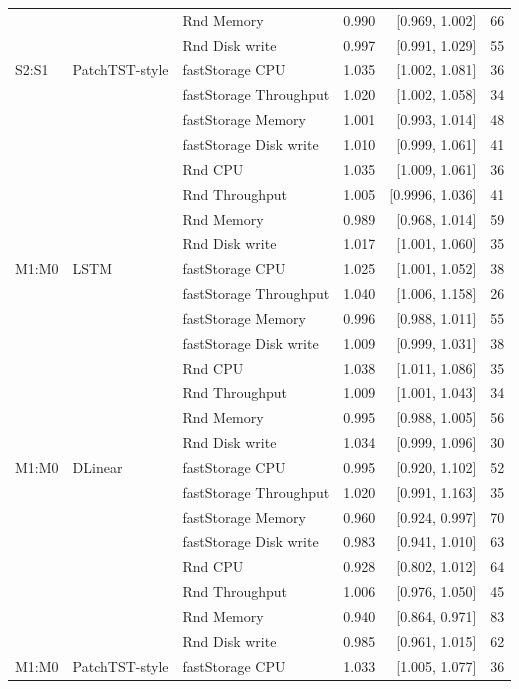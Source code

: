 \documentclass[a4paper,11pt]{article}
\begin{document}
\begin{longtable}{@{}lllrrr@{}}
 &  & Rnd Memory & 0.990 & [0.969, 1.002] & 66 \\
 &  & Rnd Disk write & 0.997 & [0.991, 1.029] & 55 \\
\addlinespace
S2:S1 & PatchTST-style & fastStorage CPU & 1.035 & [1.002, 1.081] & 36 \\
 &  & fastStorage Throughput & 1.020 & [1.002, 1.058] & 34 \\
 &  & fastStorage Memory & 1.001 & [0.993, 1.014] & 48 \\
 &  & fastStorage Disk write & 1.010 & [0.999, 1.061] & 41 \\
 &  & Rnd CPU & 1.035 & [1.009, 1.061] & 36 \\
 &  & Rnd Throughput & 1.005 & [0.9996, 1.036] & 41 \\
 &  & Rnd Memory & 0.989 & [0.968, 1.014] & 59 \\
 &  & Rnd Disk write & 1.017 & [1.001, 1.060] & 35 \\
\addlinespace
M1:M0 & LSTM & fastStorage CPU & 1.025 & [1.001, 1.052] & 38 \\
 &  & fastStorage Throughput & 1.040 & [1.006, 1.158] & 26 \\
 &  & fastStorage Memory & 0.996 & [0.988, 1.011] & 55 \\
 &  & fastStorage Disk write & 1.009 & [0.999, 1.031] & 38 \\
 &  & Rnd CPU & 1.038 & [1.011, 1.086] & 35 \\
 &  & Rnd Throughput & 1.009 & [1.001, 1.043] & 34 \\
 &  & Rnd Memory & 0.995 & [0.988, 1.005] & 56 \\
 &  & Rnd Disk write & 1.034 & [0.999, 1.096] & 30 \\
\addlinespace
M1:M0 & DLinear & fastStorage CPU & 0.995 & [0.920, 1.102] & 52 \\
 &  & fastStorage Throughput & 1.020 & [0.991, 1.163] & 35 \\
 &  & fastStorage Memory & 0.960 & [0.924, 0.997] & 70 \\
 &  & fastStorage Disk write & 0.983 & [0.941, 1.010] & 63 \\
 &  & Rnd CPU & 0.928 & [0.802, 1.012] & 64 \\
 &  & Rnd Throughput & 1.006 & [0.976, 1.050] & 45 \\
 &  & Rnd Memory & 0.940 & [0.864, 0.971] & 83 \\
 &  & Rnd Disk write & 0.985 & [0.961, 1.015] & 62 \\
\addlinespace
M1:M0 & PatchTST-style & fastStorage CPU & 1.033 & [1.005, 1.077] & 36 \\

\end{longtable}
\end{document}
